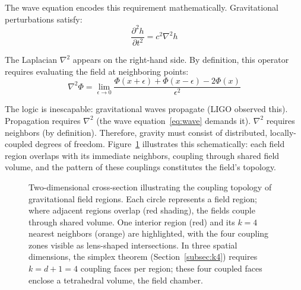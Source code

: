 \documentclass[aps,prd,preprint,superscriptaddress,showpacs,preprintnumbers,amsmath,amssymb,nofootinbib]{revtex4-2}
\begin{document}
The wave equation encodes this requirement mathematically. Gravitational perturbations satisfy:
\begin{equation}
\frac{\partial^2 h}{\partial t^2} = c^2 \nabla^2 h
\label{eq:wave}
\end{equation}

The Laplacian $\nabla^2$ appears on the right-hand side. By definition, this operator requires evaluating the field at neighboring points:
\begin{equation}
\nabla^2 \Phi = \lim_{\epsilon \to 0} \frac{\Phi(x+\epsilon) + \Phi(x-\epsilon) - 2\Phi(x)}{\epsilon^2}
\label{eq:laplacian}
\end{equation}

The logic is inescapable: gravitational waves propagate (LIGO observed this). Propagation requires $\nabla^2$ (the wave equation~\eqref{eq:wave} demands it). $\nabla^2$ requires neighbors (by definition). Therefore, gravity must consist of distributed, locally-coupled degrees of freedom. Figure~\ref{fig:packing} illustrates this schematically: each field region overlaps with its immediate neighbors, coupling through shared field volume, and the pattern of these couplings constitutes the field's topology.

\begin{figure}[H]
\centering
{}
\caption{Two-dimensional cross-section illustrating the coupling topology of gravitational field regions. Each circle represents a field region; where adjacent regions overlap (red shading), the fields couple through shared volume. One interior region (red) and its $k = 4$ nearest neighbors (orange) are highlighted, with the four coupling zones visible as lens-shaped intersections. In three spatial dimensions, the simplex theorem (Section~\ref{subsec:k4}) requires $k = d + 1 = 4$ coupling faces per region; these four coupled faces enclose a tetrahedral volume, the field chamber.}
\label{fig:packing}
\end{figure}
\end{document}

